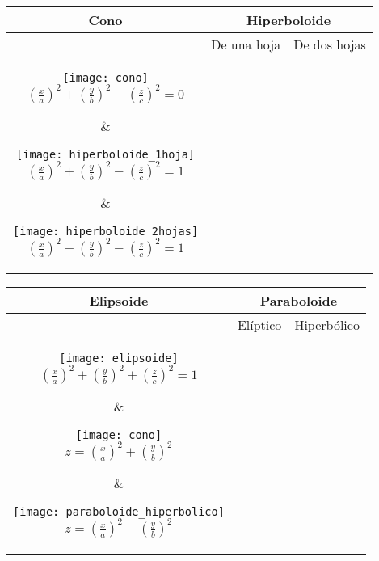 \documentclass[twoside]{article}
\numberwithin{equation}{section}
\numberwithin{figure}{section}
\numberwithin{table}{section}
\begin{document}
				\begin{center}
					\begin{tabular}{c | c c}
						\textbf{Cono} & \multicolumn{2}{c}{\textbf{Hiperboloide}} \\ 
						\hline
						  & De una hoja & De dos hojas \\ 
						
						\parbox{5cm}{\begin{center}\texttt{[image: cono]}\\
											$\left(\frac{x}{a}\right)^2+\left(\frac{y}{b}\right)^2-\left(\frac{z}{c}\right)^2=0$\end{center}} &
						\parbox{5cm}{\begin{center}	\texttt{[image: hiperboloide\_1hoja]} \\
											$\left(\frac{x}{a}\right)^2+\left(\frac{y}{b}\right)^2-\left(\frac{z}{c}\right)^2=1$\end{center}} &
						\parbox{5cm}{\begin{center}	\texttt{[image: hiperboloide\_2hojas]} \\
											$\left(\frac{x}{a}\right)^2-\left(\frac{y}{b}\right)^2-\left(\frac{z}{c}\right)^2=1$\end{center}} \\
							
					\end{tabular} 
				\end{center}		
				
				\begin{center}
					\begin{tabular}{c | c c}
						\textbf{Elipsoide} & \multicolumn{2}{c}{\textbf{Paraboloide}} \\ 
						\hline
						 & Elíptico & Hiperbólico \\ 
						
						\parbox{5cm}{\begin{center}\texttt{[image: elipsoide]}\\
											$\left(\frac{x}{a}\right)^2+\left(\frac{y}{b}\right)^2+\left(\frac{z}{c}\right)^2=1$\end{center}} &
						\parbox{5cm}{\begin{center}	\texttt{[image: cono]} \\
											$z=\left(\frac{x}{a}\right)^2+\left(\frac{y}{b}\right)^2$\end{center}} &
						\parbox{5cm}{\begin{center}	\texttt{[image: paraboloide\_hiperbolico]} \\
											$z=\left(\frac{x}{a}\right)^2-\left(\frac{y}{b}\right)^2$\end{center}} \\
							
					\end{tabular} 
				\end{center}		
\end{document}
